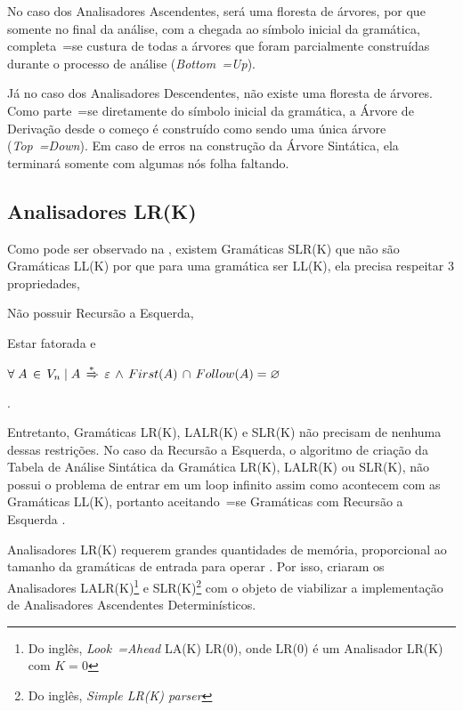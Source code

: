 No caso dos Analisadores Ascendentes,
será uma floresta de árvores,
por que somente no final da análise,
com a chegada ao símbolo inicial da gramática,
completa~=se custura de todas a árvores que foram parcialmente construídas durante o processo de análise (\textit{Bottom~=Up}).

Já no caso dos Analisadores Descendentes,
não existe uma floresta de árvores.
Como parte~=se diretamente do símbolo inicial da gramática,
a Árvore de Derivação desde o começo é construído como sendo uma única árvore (\textit{Top~=Down}).
Em caso de erros na construção da Árvore Sintática,
ela terminará somente com algumas nós folha faltando.


\subsection{Analisadores LR(K)}

Como pode ser observado na ,
existem Gramáticas SLR(K) que não são Gramáticas LL(K) por que para uma gramática ser LL(K),
ela precisa respeitar 3 propriedades,
\begin{inparaenum}
    \item Não possuir Recursão a Esquerda,
    \item Estar fatorada e
    \item $\forall\; A\, \in\, V_n\; |\; A\,
            \xRightarrow{*}\, \varepsilon\,
            \land\, First(A)\, \cap\, Follow(A) = \varnothing$
\end{inparaenum}
\cite{ahoCompilerDragonBook}.

Entretanto,
Gramáticas LR(K), LALR(K) e
SLR(K) não precisam de nenhuma dessas restrições.
No caso da Recursão a Esquerda,
o algoritmo de criação da Tabela de Análise Sintática da Gramática LR(K),
LALR(K) ou SLR(K),
não possui o problema de entrar em um loop infinito assim como acontecem com as Gramáticas LL(K),
portanto aceitando~=se Gramáticas com Recursão a Esquerda \cite{ahoCompilerDragonBook}.

Analisadores LR(K) requerem grandes quantidades de memória,
proporcional ao tamanho da gramáticas de entrada para operar \cite{complexityOfLRKTesting}.
Por isso,
 criaram os Analisadores LALR(K)\footnote{
Do inglês, \textit{Look~=Ahead} LA(K) LR(0),
onde LR(0) é um Analisador LR(K) com $K=0$
}
e SLR(K)\footnote{
Do inglês, \textit{Simple LR(K) parser}
}
com o objeto de viabilizar a implementação de Analisadores Ascendentes Determinísticos.

